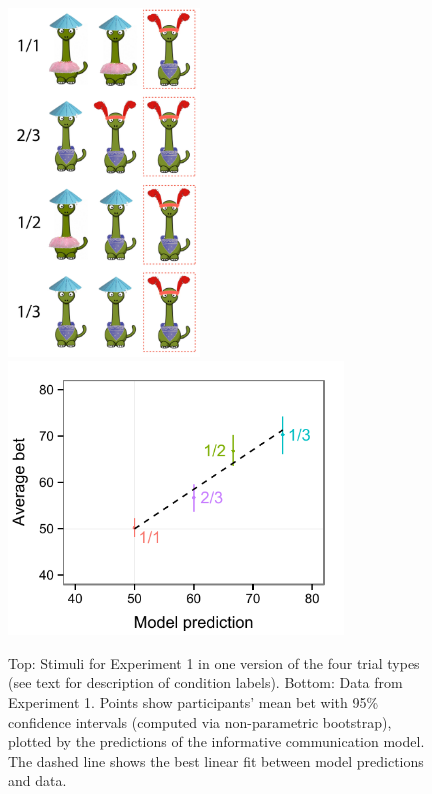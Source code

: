 \documentclass[review]{elsarticle}
\begin{document}
\begin{figure}
\begin{center}
\includegraphics[width=2in]{stims_complex.pdf}
\includegraphics[width=3.5in]{info_adults_lm_mod.pdf}
\caption{\label{fig:adults} Top: Stimuli for Experiment 1 in one version of the four trial types (see text for description of condition labels). Bottom: Data from Experiment 1. Points show participants' mean bet with 95\% confidence intervals (computed via non-parametric bootstrap), plotted by the predictions of the informative communication model. The dashed line shows the best linear fit between model predictions and data.}
\end{center}
\end{figure}
\end{document}

